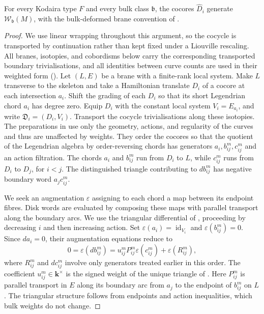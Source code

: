 \documentclass[a4paper]{amsart}
\newcommand{\kk}{\mathbf{k}}
\numberwithin{equation}{section}
\begin{document}
\begin{proposition}\label{prop:bulk-generation}
For every Kodaira type $F$ and every bulk class $\mathfrak{b}$, the
cocores $\widehat D_i$ generate
$\mathcal W_{\mathfrak{b}}(M)$, with the bulk-deformed brane
convention of .
\end{proposition}
\begin{proof}
We use linear wrapping throughout this argument, so the cocycle is
transported by continuation rather than kept fixed under a Liouville
rescaling. All branes, isotopies, and cobordisms below carry the
corresponding transported boundary trivialisations, and all
identities between curve counts are used in their weighted form
(). Let $(L,E)$ be a brane with a
finite-rank local system. Make $L$ transverse to the skeleton and take
a Hamiltonian translate $D_i$ of a cocore at each intersection $a_i$.
Shift the grading of each $D_i$ so that its short Legendrian chord
$a_i$ has degree zero.
Equip $D_i$ with the constant local system $V_i=E_{a_i}$, and write
$\mathfrak D_i=(D_i,V_i)$. Transport the cocycle trivialisations
along these isotopies. The preparations in
\cite[Section~9.1 and Lemma~9.4]{CDRGG} use only the geometry,
actions, and regularity of the curves and thus are unaffected by
weights. They order the cocores so that the quotient of the
Legendrian algebra by order-reversing chords has generators
$a_i,b_{ij}^m,c_{ij}^m$ and an action filtration.
The chords $a_i$ and $b_{ij}^m$ run from $D_i$ to $L$, while
$c_{ij}^m$ runs from $D_i$ to $D_j$, for $i<j$.
The distinguished triangle contributing to $db_{ij}^m$ has negative
boundary word $a_jc_{ij}^m$.

We seek an augmentation $\varepsilon$ assigning to each chord a map
between its endpoint fibres. Disk words are evaluated by composing
these maps with parallel transport along the boundary arcs.
We use the triangular differential of \cite[Lemma~9.5]{CDRGG},
proceeding by decreasing $i$ and then increasing action. Set
$\varepsilon(a_i)=\operatorname{id}_{V_i}$ and
$\varepsilon(b_{ij}^m)=0$. Since $da_i=0$, their augmentation
equations reduce to
\[
 0=\varepsilon(db_{ij}^m)
   =u_{ij}^m P_{ij}^m\varepsilon(c_{ij}^m)+\varepsilon(R_{ij}^m),
\]
where $R_{ij}^m$ and $dc_{ij}^m$ involve only generators treated
earlier in this order. The coefficient $u_{ij}^m\in\kk^\times$ is
the signed weight of the unique triangle of \cite[Lemma~9.4]{CDRGG}.
Here $P_{ij}^m$ is parallel transport in $E$ along its boundary arc
from $a_j$ to the endpoint of $b_{ij}^m$ on $L$.
The triangular structure follows from endpoints and action
inequalities, which bulk weights do not change.


\end{proof}
\end{document}
